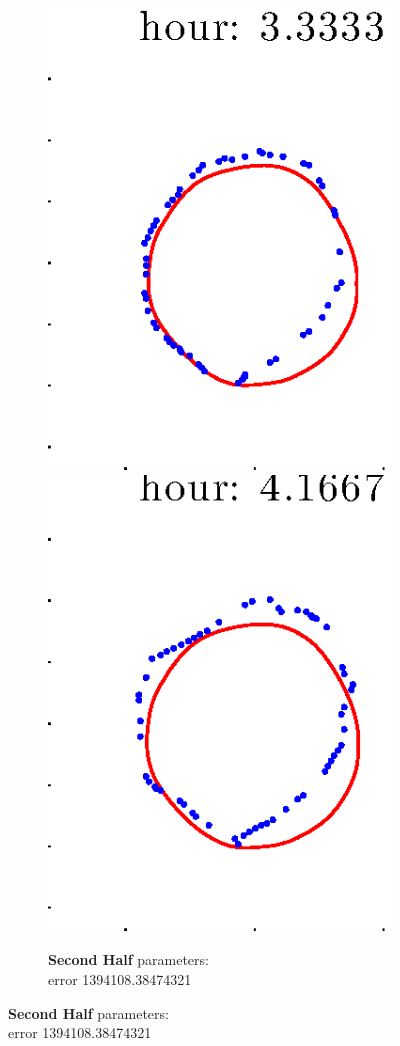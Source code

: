 \documentclass[12pt]{article}
\begin{document}
\begin{figure}[h!]
\begin{subfigure}[b]{.3\textwidth}
		\includegraphics[height=.15\textheight]{Pos14exp8/secondhalf/second5.eps}
		\includegraphics[height=.15\textheight]{Pos14exp8/secondhalf/second6.eps}
		\caption{\textbf{Second Half} parameters: \\error 1394108.38474321}
	\end{subfigure}
\end{figure}
\end{document}
